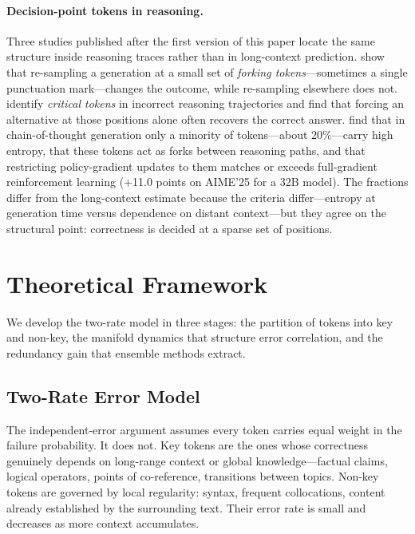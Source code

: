 \paragraph{Decision-point tokens in reasoning.}
Three studies published after the first version of this paper locate the same structure inside reasoning traces rather than in long-context prediction. \citet{bigelow2025forking} show that re-sampling a generation at a small set of \emph{forking tokens}---sometimes a single punctuation mark---changes the outcome, while re-sampling elsewhere does not. \citet{lin2024critical} identify \emph{critical tokens} in incorrect reasoning trajectories and find that forcing an alternative at those positions alone often recovers the correct answer. \citet{wang2025beyond8020} find that in chain-of-thought generation only a minority of tokens---about $20\%$---carry high entropy, that these tokens act as forks between reasoning paths, and that restricting policy-gradient updates to them matches or exceeds full-gradient reinforcement learning (+11.0 points on AIME'25 for a 32B model). The fractions differ from the long-context estimate because the criteria differ---entropy at generation time versus dependence on distant context---but they agree on the structural point: correctness is decided at a sparse set of positions.

\section{Theoretical Framework}
\label{sec:framework}

We develop the two-rate model in three stages: the partition of tokens into key and non-key, the manifold dynamics that structure error correlation, and the redundancy gain that ensemble methods extract.

\subsection{Two-Rate Error Model}

The independent-error argument assumes every token carries equal weight in the failure probability. It does not. Key tokens are the ones whose correctness genuinely depends on long-range context or global knowledge---factual claims, logical operators, points of co-reference, transitions between topics. Non-key tokens are governed by local regularity: syntax, frequent collocations, content already established by the surrounding text. Their error rate is small and decreases as more context accumulates.

